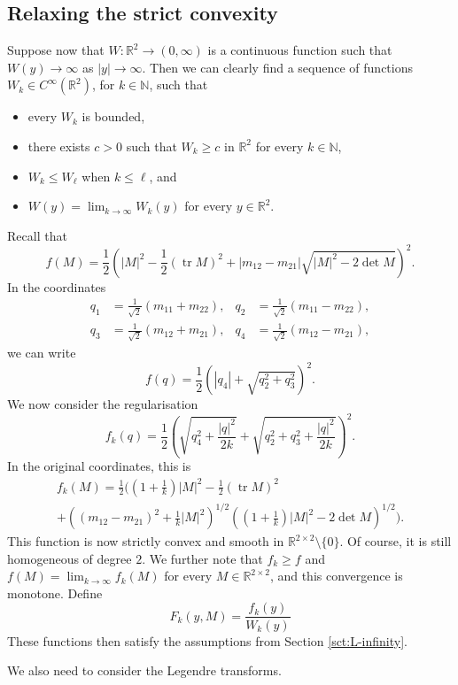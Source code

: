 \documentclass[a4paper]{article}
\newcommand{\R}{\mathbb{R}}
\newcommand{\N}{\mathbb{N}}
\DeclareMathOperator{\tr}{tr}
\theoremstyle{definition}
\theoremstyle{remark}
\begin{document}
\subsection{Relaxing the strict convexity}

Suppose now that $W \colon \R^2 \to (0, \infty)$ is a continuous function such that
$W(y) \to \infty$ as $|y| \to \infty$. Then we can clearly
find a sequence of functions $W_k \in C^\infty(\R^2)$, for $k \in \N$, such that
\begin{itemize}
\item
every $W_k$ is bounded,
\item
there exists $c > 0$ such that $W_k \ge c$ in $\R^2$ for every $k \in \N$,
\item
$W_k \le W_\ell$ when $k \le \ell$, and
\item
$W(y) = \lim_{k \to \infty} W_k(y)$ for every $y \in \R^2$.
\end{itemize}

Recall that
\[
f(M) = \frac{1}{2} \left(|M|^2 - \frac{1}{2} (\tr M)^2 + |m_{12} - m_{21}| \sqrt{|M|^2 - 2\det M}\right)^2.
\]
In the coordinates
\begin{align*}
q_1 & = \frac{1}{\sqrt{2}} (m_{11} + m_{22}), & q_2 & = \frac{1}{\sqrt{2}} (m_{11} - m_{22}), \\
q_3 & = \frac{1}{\sqrt{2}} (m_{12} + m_{21}), & q_4 & = \frac{1}{\sqrt{2}} (m_{12} - m_{21}),
\end{align*}
we can write
\[
f(q) = \frac{1}{2}\left(|q_4| + \sqrt{q_2^2 + q_3^2}\right)^2.
\]
We now consider the regularisation
\[
f_k(q) = \frac{1}{2}\left(\sqrt{q_4^2 + \frac{|q|^2}{2k}} + \sqrt{q_2^2 + q_3^2 + \frac{|q|^2}{2k}}\right)^2.
\]
In the original coordinates, this is
\begin{multline*}
f_k(M) = \frac{1}{2} \Biggl(\left(1 + \frac{1}{k}\right) |M|^2 - \frac{1}{2} (\tr M)^2 \\
+ \left((m_{12} - m_{21})^2 + \frac{1}{k} |M|^2\right)^{1/2} \left(\left(1 + \frac{1}{k}\right) |M|^2 - 2 \det M\right)^{1/2}\Biggr).
\end{multline*}
This function is now strictly convex and smooth in
$\R^{2 \times 2} \setminus \{0\}$. Of course, it is still homogeneous of
degree $2$. We further note that $f_k \ge f$ and $f(M) = \lim_{k \to \infty} f_k(M)$
for every $M \in \R^{2 \times 2}$, and this convergence is monotone.
Define
\[
F_k(y, M) = \frac{f_k(y)}{W_k(y)}
\]
These functions then satisfy the assumptions from Section \ref{sct:L-infinity}.

We also need to consider the Legendre transforms.
\end{document}

